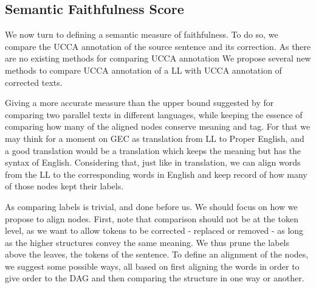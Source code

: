 \documentclass[letter,11pt]{article}
\begin{document}
		
		
		\subsection{Semantic Faithfulness Score}
		
		
		
		
		
		We now turn to defining a semantic measure of faithfulness. 
		To do so, we compare the UCCA annotation of the source sentence and its correction. 
		As there are no existing methods for comparing UCCA annotation 
		We propose several new methods to compare UCCA annotation of a LL with UCCA annotation of corrected texts.
		
		Giving a more accurate
		measure than the upper bound suggested by \cite{sulem2015conceptual} for
		comparing two parallel texts in different languages, while keeping
		the essence of comparing how many of the aligned nodes conserve meaning and tag. For that we may think for a moment on GEC as
		translation from LL to Proper English, and a good translation
		would be a translation which keeps the meaning but has the syntax
		of English. Considering that, just like in translation, we can align words from the LL to the corresponding words in English
		and keep record of how many of those nodes kept their labels.
		
		As comparing labels is trivial, and done before us. We should focus on how we propose to align nodes. 
		First, note that comparison should not be at
		the token level, as we want to allow tokens to be corrected - replaced or removed -
		as long as the higher structures convey the same meaning. We thus
		prune the labels above the leaves, the tokens of the sentence. To
		define an alignment of the nodes, we suggest some possible ways, all
		based on first aligning the words in order to give order to the DAG and then comparing the structure in one way or another.
		
\end{document}
